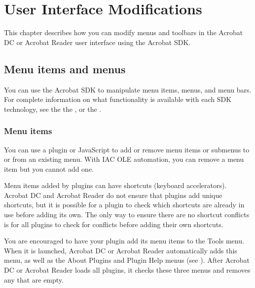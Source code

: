 \documentclass[letterpaper,12pt,english,openany,oneside]{sphinxmanual}
\begin{document}
\chapter{User Interface Modifications}
\label{\detokenize{Overview_UserInterface:user-interface-modifications}}\label{\detokenize{Overview_UserInterface::doc}}
This chapter describes how you can modify menus and toolbars in the Acrobat DC or Acrobat Reader user interface using the Acrobat SDK.




\section{Menu items and menus}
\label{\detokenize{Overview_UserInterface:menu-items-and-menus}}
You can use the Acrobat SDK to manipulate menu items, menus, and menu bars. For complete information on what functionality is available with each SDK technology, see the  the  , or the  .


\subsection{Menu items}
\label{\detokenize{Overview_UserInterface:menu-items}}
You can use a plug\sphinxhyphen{}in or JavaScript to add or remove menu items or submenus to or from an existing menu. With IAC OLE automation, you can remove a menu item but you cannot add one.

Menu items added by plug\sphinxhyphen{}ins can have shortcuts (keyboard accelerators). Acrobat DC and Acrobat Reader do not ensure that plug\sphinxhyphen{}ins add unique shortcuts, but it is possible for a plug\sphinxhyphen{}in to check which shortcuts are already in use before adding its own. The only way to ensure there are no shortcut conflicts is for all plug\sphinxhyphen{}ins to check for conflicts before adding their own shortcuts.

You are encouraged to have your plug\sphinxhyphen{}in add its menu items to the Tools menu. When it is launched, Acrobat DC or Acrobat Reader automatically adds this menu, as well as the About Plug\sphinxhyphen{}ins and Plug\sphinxhyphen{}in Help menus (see ). After Acrobat DC or Acrobat Reader loads all plug\sphinxhyphen{}ins, it checks these three menus and removes any that are empty.
\end{document}
